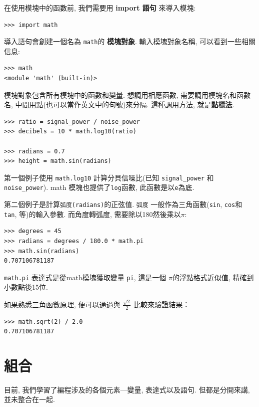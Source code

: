 \documentclass[10pt]{book}
\begin{document}
在使用模塊中的函數前, 我們需要用 {\bf import 語句} 來導入模塊:

\begin{verbatim}
>>> import math
\end{verbatim}
%
導入語句會創建一個名為 {\tt math}的 {\bf 模塊對象}. 
輸入模塊對象名稱, 可以看到一些相關信息:

\begin{verbatim}
>>> math
<module 'math' (built-in)>
\end{verbatim}
%
模塊對象包含所有模塊中的函數和變量. 想調用相應函數, 需要調用模塊名和函數名, 
中間用點(也可以當作英文中的句號)來分隔. 這種調用方法, 就是{\bf 點標法}. 

\begin{verbatim}
>>> ratio = signal_power / noise_power
>>> decibels = 10 * math.log10(ratio)

>>> radians = 0.7
>>> height = math.sin(radians)
\end{verbatim}
%
第一個例子使用 \verb"math.log10" 計算分貝信噪比(已知 \verb"signal_power" 和
\verb"noise_power"). 
math 模塊也提供了{\tt log}函數, 此函數是以{\tt e}為底. 

第二個例子是計算{\tt 弧度(radians)}的正弦值. 
{\tt 弧度} 一般作為三角函數({\tt sin}, {\tt cos}和 {\tt tan}, 等)的輸入參數. 
而角度轉弧度, 需要除以180然後乘以$\pi$:

\begin{verbatim}
>>> degrees = 45
>>> radians = degrees / 180.0 * math.pi
>>> math.sin(radians)
0.707106781187
\end{verbatim}
%
{\tt math.pi} 表達式是從math模塊獲取變量 {\tt pi}, 這是一個 $\pi$的浮點格式近似值, 
精確到小數點後15位. 

如果熟悉三角函數原理, 便可以通過與 $\frac{ \sqrt{2}} {2}$ 比較來驗證結果：

\begin{verbatim}
>>> math.sqrt(2) / 2.0
0.707106781187
\end{verbatim}
%

\section{組合}

目前, 我們學習了編程涉及的各個元素---變量, 表達式以及語句. 
但都是分開來講, 並未整合在一起. 
\end{document}
